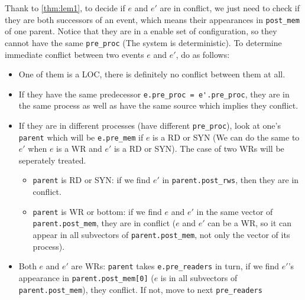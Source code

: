 \documentclass{llncs}
\begin{document}
	\noindent
	Thank to \autoref{thm:lem1}, to decide if $e$ and $e'$ are in conflict, we just need to check if
	they are both successors of an event, which means their appearances in \verb!post_mem! of one 
	parent.
	Notice that they are in a enable set of configuration, so they cannot have the same 
	\verb!pre_proc! (The system is deterministic). To determine immediate conflict between two
	events $e$ and $e'$, do as follows: 
	\begin{itemize}
	\item
		One of them is a LOC, there is definitely no conflict between them at all.
	\item
		If they have the same predecessor \verb!e.pre_proc = e'.pre_proc!, they are in the same
		process as well as have the same source which implies they conflict.
	\item
		If they are in different processes (have different \verb!pre_proc!), look at one's 
		\verb!parent! which will be \verb!e.pre_mem! 		if $e$ is a RD or SYN (We can do the
		same to $e'$ when $e$ is a WR and $e'$ is a RD or SYN). The case of two WRs will be
		seperately treated.
		\begin{itemize}
		\item
			\verb!parent! is RD or SYN: if we find $e'$ in \verb!parent.post_rws!, then they are in
			conflict.
		\item
			\verb!parent! is WR or bottom: if we find $e$ and $e'$ in the same vector of
			\verb!parent.post_mem!, they are in conflict ($e$ and $e'$ can be a WR, so it can appear
			 in all subvectors of \verb!parent.post_mem!, not only the vector of its process).
	\end{itemize}
	\item
		Both $e$ and $e'$ are WRs: \verb!parent! takes \verb!e.pre_readers! in turn, if we find $e'$'s appearance in \verb!parent.post_mem[0]! ($e$ is in all subvectors of \verb!parent.post_mem!), they conflict. If not, move to next \verb!pre_readers!
	
\end{itemize}
	
\end{document}
